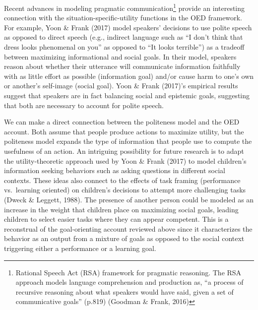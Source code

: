 \documentclass[oneside]{report}
\begin{document}
Recent advances in modeling pragmatic communication\footnote{Rational
  Speech Act (RSA) framework for pragmatic reasoning. The RSA approach
  models language comprehension and production as, ``a process of
  recursive reasoning about what speakers would have said, given a set
  of communicative goals'' (p.819) (Goodman \& Frank, 2016)} provide an
interesting connection with the situation-specific-utility functions in
the OED framework. For example, Yoon \& Frank (2017) model speakers'
decisions to use polite speech as opposed to direct speech (e.g.,
indirect language such as ``I don't think that dress looks phenomenal on
you'' as opposed to ``It looks terrible'') as a tradeoff between
maximizing informational and social goals. In their model, speakers
reason about whether their utterance will communicate information
faithfully with as little effort as possible (information goal) and/or
cause harm to one's own or another's self-image (social goal). Yoon \&
Frank (2017)'s empirical results suggest that speakers are in fact
balancing social and epistemic goals, suggesting that both are necessary
to account for polite speech.

We can make a direct connection between the politeness model and the OED
account. Both assume that people produce actions to maximize utility,
but the politeness model expands the type of information that people use
to compute the usefulness of an action. An intriguing possibility for
future research is to adapt the utility-theoretic approach used by Yoon
\& Frank (2017) to model children's information seeking behaviors such
as asking questions in different social contexts. These ideas also
connect to the effects of task framing (performance vs.~learning
oriented) on children's decisions to attempt more challenging tasks
(Dweck \& Leggett, 1988). The presence of another person could be
modeled as an increase in the weight that children place on maximizing
social goals, leading children to select easier tasks where they can
appear competent. This is a reconstrual of the goal-orienting account
reviewed above since it characterizes the behavior as an output from a
mixture of goals as opposed to the social context triggering either a
performance or a learning goal.
\end{document}

